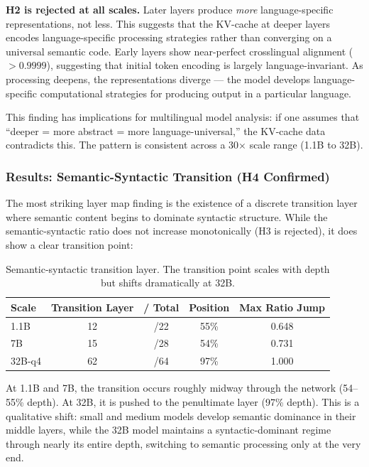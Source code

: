 \documentclass[11pt,a4paper]{article}
\begin{document}
\textbf{H2 is rejected at all scales.} Later layers produce \emph{more} language-specific representations, not less. This suggests that the KV-cache at deeper layers encodes language-specific processing strategies rather than converging on a universal semantic code. Early layers show near-perfect crosslingual alignment ($> 0.9999$), suggesting that initial token encoding is largely language-invariant. As processing deepens, the representations diverge --- the model develops language-specific computational strategies for producing output in a particular language.

This finding has implications for multilingual model analysis: if one assumes that ``deeper = more abstract = more language-universal,'' the KV-cache data contradicts this. The pattern is consistent across a 30$\times$ scale range (1.1B to 32B).

\subsubsection{Results: Semantic-Syntactic Transition (H4 Confirmed)}

The most striking layer map finding is the existence of a discrete transition layer where semantic content begins to dominate syntactic structure. While the semantic-syntactic ratio does not increase monotonically (H3 is rejected), it does show a clear transition point:

\begin{table}[H]
\centering
\caption{Semantic-syntactic transition layer. The transition point scales with depth but shifts dramatically at 32B.}
\label{tab:sem_syn}
\begin{tabular}{lcccc}
\toprule
\textbf{Scale} & \textbf{Transition Layer} & \textbf{/ Total} & \textbf{Position} & \textbf{Max Ratio Jump} \\
\midrule
1.1B & 12 & /22 & 55\% & 0.648 \\
7B & 15 & /28 & 54\% & 0.731 \\
32B-q4 & 62 & /64 & 97\% & 1.000 \\
\bottomrule
\end{tabular}
\end{table}

At 1.1B and 7B, the transition occurs roughly midway through the network (54--55\% depth). At 32B, it is pushed to the penultimate layer (97\% depth). This is a qualitative shift: small and medium models develop semantic dominance in their middle layers, while the 32B model maintains a syntactic-dominant regime through nearly its entire depth, switching to semantic processing only at the very end.
\end{document}
